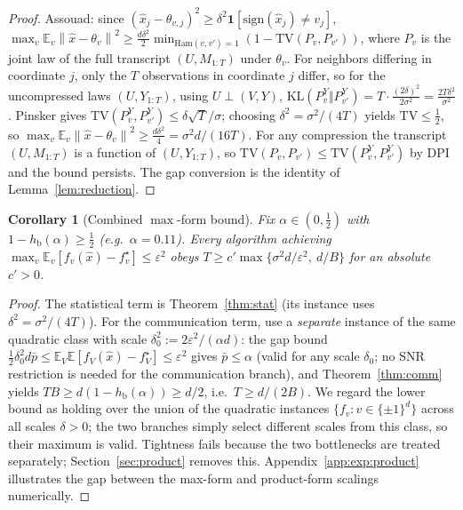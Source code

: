 \documentclass[11pt]{article}
\newtheorem{corollary}{Corollary}
\theoremstyle{definition}
\newcommand{\E}{\mathbb{E}}
\newcommand{\KL}{\mathrm{KL}}
\newcommand{\TV}{\mathrm{TV}}
\newcommand{\sign}{\mathrm{sign}}
\newcommand{\Ind}{\mathbf{1}}
\newcommand{\hb}{h_{\mathrm{b}}}
\newcommand{\eps}{\varepsilon}
\newcommand{\norm}[1]{\left\lVert #1 \right\rVert}
\begin{document}
\begin{proof}
Assouad: since $(\hat x_j-\theta_{v,j})^2\ge\delta^2\Ind[\sign(\hat x_j)\neq v_j]$,
$\max_v\E_v\norm{\hat x-\theta_v}^2\ge\tfrac{d\delta^2}{2}\min_{\mathrm{Ham}(v,v')=1}(1-\TV(P_v,P_{v'}))$,
where $P_v$ is the joint law of the full transcript $(U,M_{1:T})$ under $\theta_v$. For neighbors differing
in coordinate $j$, only the $T$ observations in coordinate $j$ differ, so for the uncompressed laws
$(U,Y_{1:T})$, using $U\perp(V,Y)$,
$\KL(P^Y_v\Vert P^Y_{v'})=T\cdot\frac{(2\delta)^2}{2\sigma^2}=\frac{2T\delta^2}{\sigma^2}$. Pinsker gives
$\TV(P^Y_v,P^Y_{v'})\le\delta\sqrt{T}/\sigma$; choosing $\delta^2=\sigma^2/(4T)$ yields $\TV\le\tfrac12$,
so $\max_v\E_v\norm{\hat x-\theta_v}^2\ge\tfrac{d\delta^2}{4}=\sigma^2 d/(16T)$. For any compression the
transcript $(U,M_{1:T})$ is a function of $(U,Y_{1:T})$, so $\TV(P_v,P_{v'})\le\TV(P^Y_v,P^Y_{v'})$ by DPI
and the bound persists. The gap conversion is the identity of Lemma~\ref{lem:reduction}.
\end{proof}

\begin{corollary}[Combined $\max$-form bound]
\label{cor:combined}
Fix $\alpha\in(0,\tfrac12)$ with $1-\hb(\alpha)\ge\tfrac12$ (e.g.\ $\alpha=0.11$). Every algorithm
achieving $\max_v\E_v[f_v(\hat x)-f_v^\star]\le\eps^2$ obeys $T\ge c'\max\{\sigma^2 d/\eps^2,\ d/B\}$ for
an absolute $c'>0$.
\end{corollary}

\begin{proof}
The statistical term is Theorem~\ref{thm:stat} (its instance uses $\delta^2=\sigma^2/(4T)$). For the
communication term, use a \emph{separate} instance of the same quadratic class with scale
$\delta_0^2:=2\eps^2/(\alpha d)$: the gap bound $\tfrac12\delta_0^2 d\bar p\le\E_V\E[f_V(\hat x)-f_V^\star]\le\eps^2$
gives $\bar p\le\alpha$ (valid for any scale $\delta_0$; no SNR restriction is needed for the
communication branch), and Theorem~\ref{thm:comm} yields $TB\ge d(1-\hb(\alpha))\ge d/2$, i.e.\
$T\ge d/(2B)$. We regard the lower bound as holding over the union of the quadratic instances
$\{f_v:v\in\{\pm1\}^d\}$ across all scales $\delta>0$; the two branches simply select different scales
from this class, so their maximum is valid. Tightness fails because the two bottlenecks are treated
separately; Section~\ref{sec:product} removes this. Appendix~\ref{app:exp:product} illustrates the gap
between the max-form and product-form scalings numerically.
\end{proof}
\end{document}
